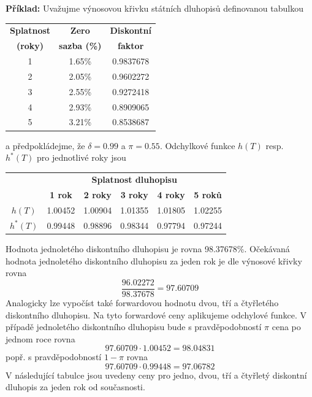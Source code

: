 \documentclass[a4paper]{book}
\begin{document}
\noindent \textbf{Příklad:} Uvažujme výnosovou křivku státních dluhopisů definovanou tabulkou
\begin{center}
\begin{tabular}{c c c}
\textbf{Splatnost} & \textbf{Zero} & \textbf{Diskontní} \\
\textbf{(roky)} & \textbf{sazba (\%)} & \textbf{faktor} \\
\hline
1 & 1.65\% & 0.9837678 \\
2 & 2.05\% & 0.9602272 \\
3 & 2.55\% & 0.9272418 \\
4 & 2.93\% & 0.8909065 \\
5 & 3.21\% & 0.8538687
\end{tabular}
\end{center}
a předpokládejme, že $\delta = 0.99$ a $\pi = 0.55$. Odchylkové funkce $h(T)$ resp. $h^{*}(T)$ pro jednotlivé roky jsou
\begin{center}
\begin{tabular}{c c c c c c}
                    & \multicolumn{5}{c}{\textbf{Splatnost dluhopisu}}\\
                    & \textbf{1 rok} & \textbf{2 roky} & \textbf{3 roky} & \textbf{4 roky} & \textbf{5 roků} \\
\hline
\textbf{$h(T)$}     & 1.00452 & 1.00904 & 1.01355 & 1.01805 & 1.02255 \\
\textbf{$h^{*}(T)$} & 0.99448 & 0.98896 & 0.98344 & 0.97794 & 0.97244
\end{tabular}
\end{center}
Hodnota jednoletého diskontního dluhopisu je rovna 98.37678\%. Očekávaná hodnota jednoletého diskontního dluhopisu za jeden rok je dle výnosové křivky rovna
\begin{equation*}
\frac{96.02272}{98.37678} = 97.60709
\end{equation*}
Analogicky lze vypočíst také forwardovou hodnotu dvou, tří a čtyřletého diskontního dluhopisu. Na tyto forwardové ceny aplikujeme odchylové funkce. V případě jednoletého diskontního dluhopisu bude s pravděpodobností $\pi$ cena po jednom roce rovna 
\begin{equation*}
97.60709 \cdot 1.00452 = 98.04831
\end{equation*}
popř. s pravděpodobností $1-\pi$ rovna
\begin{equation*}
97.60709 \cdot 0.99448 = 97.06782
\end{equation*}
V následující tabulce jsou uvedeny ceny pro jedno, dvou, tří a čtyřletý diskontní dluhopis za jeden rok od současnosti.
\end{document}
